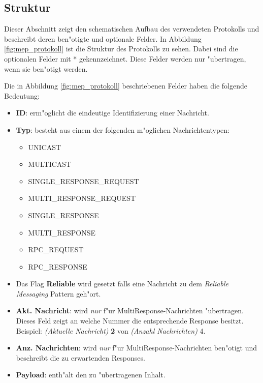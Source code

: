 \subsection{Struktur}
Dieser Abschnitt zeigt den schematischen Aufbau des verwendeten Protokolls und beschreibt deren ben"otigte und optionale Felder. In Abbildung \ref{fig:mep_protokoll} ist die Struktur des Protokolls zu sehen. Dabei sind die optionalen Felder mit * gekennzeichnet. Diese Felder werden nur "ubertragen, wenn sie ben"otigt werden. 

Die in Abbildung \ref{fig:mep_protokoll} beschriebenen Felder haben die folgende Bedeutung: 

\begin{itemize}
\item {\bf ID}: erm"oglicht die eindeutige Identifizierung einer Nachricht.
\item {\bf Typ}: besteht aus einem der folgenden m"oglichen Nachrichtentypen:
\begin{itemize}
\item UNICAST
\item MULTICAST
\item SINGLE\_RESPONSE\_REQUEST
\item MULTI\_RESPONSE\_REQUEST
\item SINGLE\_RESPONSE
\item MULTI\_RESPONSE
\item RPC\_REQUEST
\item RPC\_RESPONSE
\end{itemize}
\item Das Flag {\bf Reliable} wird gesetzt falls eine Nachricht zu dem \emph{Reliable Messaging} Pattern geh"ort.
\item {\bf Akt. Nachricht}: wird \emph{nur} f"ur MultiResponse-Nachrichten "ubertragen. Dieses Feld zeigt an welche Nummer die entsprechende Response besitzt. Beispiel: \emph{(Aktuelle Nachricht)} {\bf 2} von \emph{(Anzahl Nachrichten)} 4.
\item {\bf Anz. Nachrichten}: wird \emph{nur} f"ur MultiResponse-Nachrichten ben"otigt und beschreibt die zu erwartenden Responses. 
\item {\bf Payload}: enth"alt den zu "ubertragenen Inhalt.
\end{itemize}

